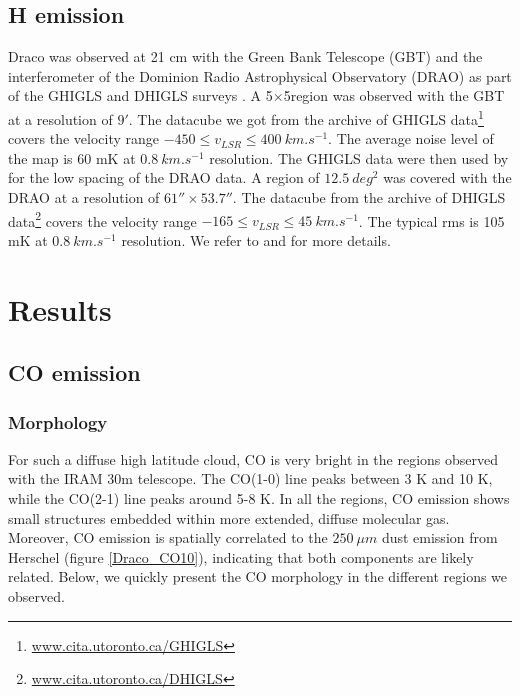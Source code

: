 \documentclass[traditabstract]{aa}
\begin{document}
   \subsection{H emission}

   Draco was observed at 21 cm with the Green Bank Telescope (GBT) and the interferometer of the Dominion Radio Astrophysical Observatory (DRAO) as part of the GHIGLS and DHIGLS surveys \citep{Martin_2015,Blagrave_2017}.
A 5\degree$\times $5\degree region was observed with the GBT at a resolution of $9'$. The datacube we got from the archive of GHIGLS data\footnote{\url{www.cita.utoronto.ca/GHIGLS}} covers the velocity range $-450\leq v_{LSR}\leq 400\: km.s^{-1}$. The average noise level of the map is 60 mK at $0.8\: km.s^{-1}$ resolution.
The GHIGLS data were then used by \cite{Blagrave_2017} for the low spacing of the DRAO data. A region of $12.5\: deg^2$ was covered with the DRAO at a resolution of $61''\times 53.7''$. The datacube from the archive of DHIGLS data\footnote{\url{www.cita.utoronto.ca/DHIGLS}} covers the velocity range $-165\leq v_{LSR}\leq 45\: km.s^{-1}$. The typical rms is 105 mK at $0.8\: km.s^{-1}$ resolution.
We refer to \cite{Martin_2015} and \cite{Blagrave_2017} for more details.




\section{Results}
\label{sec:Res}

   \subsection{CO emission}

      \subsubsection{Morphology}

   For such a diffuse high latitude cloud, CO is very bright in the regions observed with the IRAM 30m telescope. The CO(1-0) line peaks between 3 K and 10 K, while the CO(2-1) line peaks around 5-8 K. In all the regions, CO emission shows small structures embedded within more extended, diffuse molecular gas. Moreover, CO emission is spatially correlated to the $250\: \mu m$ dust emission from Herschel (figure \ref{Draco_CO10}), indicating that both components are likely related. Below, we quickly present the CO morphology in the different regions we observed.
\medskip
\end{document}
